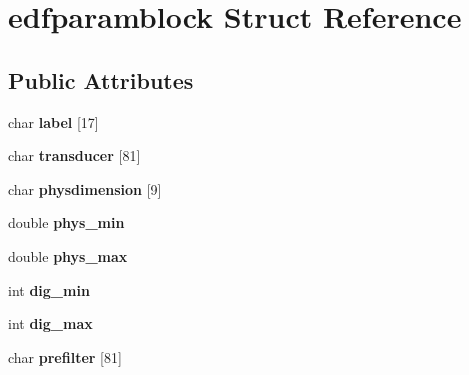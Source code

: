 \hypertarget{structedfparamblock}{}\section{edfparamblock Struct Reference}
\label{structedfparamblock}
\subsection*{Public Attributes}
\begin{DoxyCompactItemize}
\item 
\hypertarget{structedfparamblock_a1e63d722dd2c0ba9bdf7f68a4b6b3069}{}char {\bfseries label} \mbox{[}17\mbox{]}\label{structedfparamblock_a1e63d722dd2c0ba9bdf7f68a4b6b3069}

\item 
\hypertarget{structedfparamblock_a4cfbb905352392559f402f44f3f18a6a}{}char {\bfseries transducer} \mbox{[}81\mbox{]}\label{structedfparamblock_a4cfbb905352392559f402f44f3f18a6a}

\item 
\hypertarget{structedfparamblock_a0544c213f716d87df781d268a6f65a4b}{}char {\bfseries physdimension} \mbox{[}9\mbox{]}\label{structedfparamblock_a0544c213f716d87df781d268a6f65a4b}

\item 
\hypertarget{structedfparamblock_a609c4588a522c23bdbe0b0bbf82398fe}{}double {\bfseries phys\+\_\+min}\label{structedfparamblock_a609c4588a522c23bdbe0b0bbf82398fe}

\item 
\hypertarget{structedfparamblock_a6acde1045e961b06b972737bbd055aed}{}double {\bfseries phys\+\_\+max}\label{structedfparamblock_a6acde1045e961b06b972737bbd055aed}

\item 
\hypertarget{structedfparamblock_a6ec4227b042cf6384384463e4dc70b86}{}int {\bfseries dig\+\_\+min}\label{structedfparamblock_a6ec4227b042cf6384384463e4dc70b86}

\item 
\hypertarget{structedfparamblock_afbe646d589a33c301bfd9c2924bec27e}{}int {\bfseries dig\+\_\+max}\label{structedfparamblock_afbe646d589a33c301bfd9c2924bec27e}

\item 
\hypertarget{structedfparamblock_a126132fbb6b0b36a10aab93f84117200}{}char {\bfseries prefilter} \mbox{[}81\mbox{]}\label{structedfparamblock_a126132fbb6b0b36a10aab93f84117200}


\end{DoxyCompactItemize}
